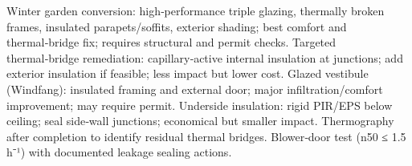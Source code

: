 \markdownRendererUlEndTight \markdownRendererInterblockSeparator
{}
\markdownRendererSectionEnd \markdownRendererSectionBegin
{}\markdownRendererInterblockSeparator
{}\markdownRendererUlBeginTight
\markdownRendererUlItem Winter garden conversion: high‑performance triple glazing, thermally broken frames, insulated parapets/soffits, exterior shading; best comfort and thermal‑bridge fix; requires structural and permit checks.\markdownRendererUlItemEnd 
\markdownRendererUlItem Targeted thermal‑bridge remediation: capillary‑active internal insulation at junctions; add exterior insulation if feasible; less impact but lower cost.\markdownRendererUlItemEnd 
\markdownRendererUlEndTight \markdownRendererInterblockSeparator
{}
\markdownRendererSectionEnd \markdownRendererSectionBegin
{}\markdownRendererInterblockSeparator
{}\markdownRendererUlBeginTight
\markdownRendererUlItem Glazed vestibule (Windfang): insulated framing and external door; major infiltration/comfort improvement; may require permit.\markdownRendererUlItemEnd 
\markdownRendererUlItem Underside insulation: rigid PIR/EPS below ceiling; seal side‑wall junctions; economical but smaller impact.\markdownRendererUlItemEnd 
\markdownRendererUlEndTight \markdownRendererInterblockSeparator
{}
\markdownRendererSectionEnd \markdownRendererSectionBegin
{}\markdownRendererInterblockSeparator
{}\markdownRendererUlBeginTight
\markdownRendererUlItem Thermography after completion to identify residual thermal bridges.\markdownRendererUlItemEnd 
\markdownRendererUlItem Blower‑door test (n50 ≤ 1.5 h⁻¹) with documented leakage sealing actions.\markdownRendererUlItemEnd 
\markdownRendererUlEndTight 
\markdownRendererSectionEnd 
\markdownRendererSectionEnd \markdownRendererDocumentEnd
